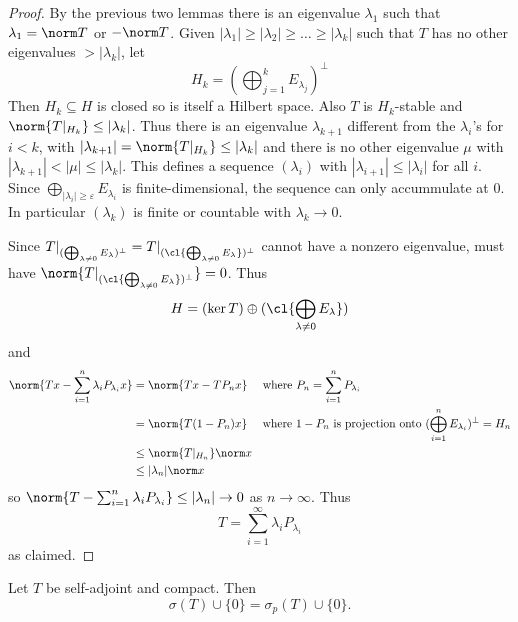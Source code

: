 \documentclass[a4paper]{article}
\begin{document}
\begin{proof}
  By the previous two lemmas there is an eigenvalue \(\lambda_1\) such that \(\lambda_1 = \norm T\) or \(- \norm T\). Given \(|\lambda_1| \geq |\lambda_2| \geq \dots \geq |\lambda_k|\) such that \(T\) has no other eigenvalues \(> |\lambda_k|\), let
  \[
    H_k = (\bigoplus_{j = 1}^k E_{\lambda_j})^\perp
  \]
  Then \(H_k \subseteq H\) is closed so is itself a Hilbert space. Also \(T\) is \(H_k\)-stable and \(\norm{T|_{H_k}} \leq |\lambda_k|\). Thus there is an eigenvalue \(\lambda_{k + 1}\) different from the \(\lambda_i\)'s for \(i < k\), with \(|\lambda_{k + 1}| = \norm{T|_{H_k}} \leq |\lambda_k|\) and there is no other eigenvalue \(\mu\) with \(|\lambda_{k + 1}| < |\mu| \leq |\lambda_k|\). This defines a sequence \((\lambda_i)\) with \(|\lambda_{i + 1}| \leq |\lambda_i|\) for all \(i\). Since \(\bigoplus_{|\lambda_i| \geq \varepsilon} E_{\lambda_i}\) is finite-dimensional, the sequence can only accummulate at \(0\). In particular \((\lambda_k)\) is finite or countable with \(\lambda_k \to 0\).

  Since \(T|_{(\bigoplus_{\lambda \neq 0} E_\lambda)^\perp} = T|_{(\cl{\bigoplus_{\lambda \neq 0} E_\lambda})^\perp}\) cannot have a nonzero eigenvalue, must have \(\norm{T|_{(\cl{\bigoplus_{\lambda \neq 0} E_\lambda})^\perp}} = 0\). Thus
  \[
    H = (\ker T) \oplus (\cl{\bigoplus_{\lambda \neq 0} E_\lambda})
  \]
  and
  \begin{align*}
    \norm{Tx - \sum_{i = 1}^n \lambda_i P_{\lambda_i} x}
    &= \norm{Tx - TP_n x} \quad \text{ where } P_n = \sum_{i = 1}^n P_{\lambda_i} \\
    &= \norm{T(1 - P_n) x} \quad \text{ where } 1 - P_n \text{ is projection onto } (\bigoplus_{i = 1}^n E_{\lambda_i})^\perp = H_n \\
    &\leq \norm{T|_{H_n}} \norm x \\
    &\leq |\lambda_n| \norm x
  \end{align*}
  so \(\norm{T - \sum_{i = 1}^n \lambda_i P_{\lambda_i}} \leq |\lambda_n| \to 0\) as \(n \to \infty\). Thus
  \[
    T = \sum_{i = 1}^\infty \lambda_i P_{\lambda_i}
  \]
  as claimed.
\end{proof}

\begin{corollary}
  Let \(T\) be self-adjoint and compact. Then
  \[
    \sigma(T) \cup \{0\} = \sigma_p(T) \cup \{0\}.
  \]
\end{corollary}
\end{document}
